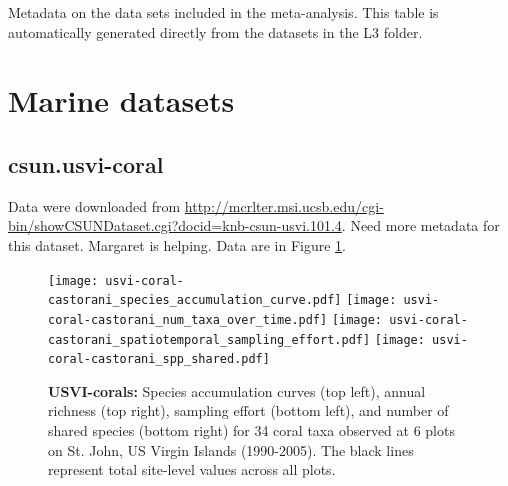 \documentclass[11pt, oneside]{article}
\begin{document}
\begin{table}[h!]
\scriptsize
   \centering
     \caption{Metadata on the data sets included in the meta-analysis. This table is automatically generated directly from the datasets in the L3 folder.} 

   \label{metadata} 
\end{table}


\section {Marine datasets}


\subsection {csun.usvi-coral}
Data were downloaded from \url{http://mcrlter.msi.ucsb.edu/cgi-bin/showCSUNDataset.cgi?docid=knb-csun-usvi.101.4}.
Need more metadata for this dataset.
Margaret is helping.
Data are in Figure \ref{usvi-coral}.

\begin{figure}[h!]
\centering
\texttt{[image: usvi-coral-castorani\_species\_accumulation\_curve.pdf]}
\texttt{[image: usvi-coral-castorani\_num\_taxa\_over\_time.pdf]}
\texttt{[image: usvi-coral-castorani\_spatiotemporal\_sampling\_effort.pdf]}
\texttt{[image: usvi-coral-castorani\_spp\_shared.pdf]}
\caption{{\bf USVI-corals:} Species accumulation curves (top left),  annual richness (top right), sampling effort (bottom left), and number of shared species (bottom right)  for 34 coral taxa observed at 6 plots on St. John, US Virgin Islands (1990-2005). The black lines represent total site-level values across all plots.}
\label{usvi-coral}
\end{figure}
\end{document}
